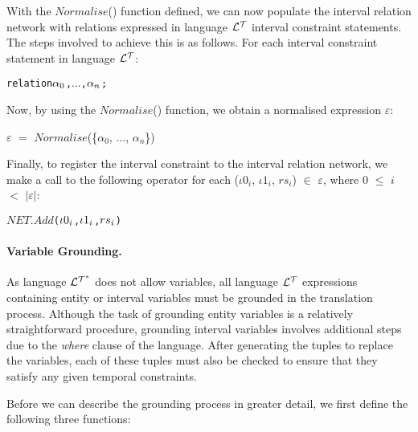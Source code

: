 \documentclass[11pt]{report}
\newenvironment{vverbatim}
{
  \begin{alltt}
}
{
    \vspace{-\baselineskip}
  \end{alltt}
}
\newenvironment{vquote}
{
  \begin{list}{}{\leftmargin 1em}\item[]
}
{
  \end{list}
}
\begin{document}
            With the $Normalise$() function defined, we can now populate the
            interval relation network with relations expressed in language
            ${\cal L^T}$ interval constraint statements. The steps involved
            to achieve this is as follows. For each interval constraint
            statement in language ${\cal L^T}$:

            \begin{vverbatim}
  relation \(\alpha\sb{0}\), \(\ldots\), \(\alpha\sb{n}\);
            \end{vverbatim}

            Now, by using the $Normalise$() function, we obtain a normalised
            expression $\varepsilon$:

            \begin{vquote}
              $\varepsilon$ $=$
                $Normalise$(\{${\alpha}_0$, $\ldots$, ${\alpha}_n$\})
            \end{vquote}

            Finally, to register the interval constraint to the interval
            relation network, we make a call to the following operator
            for each (${\iota}0_i$, ${\iota}1_i$, $rs_i$) $\in$
            $\varepsilon$, where $0$ $\leq$ $i$ $<$ $|\varepsilon|$:

            \begin{vverbatim}
  \(NET.Add\)(\({\iota}0\sb{i}\), \({\iota}1\sb{i}\), \(rs\sb{i}\))
            \end{vverbatim}

          \paragraph
            {\bf Variable Grounding.}

            As language ${\cal L^{T^*}}$ does not allow variables, all
	    language ${\cal L^T}$ expressions containing entity or interval
            variables must be grounded in the translation process. Although
            the task of grounding entity variables is a relatively
            straightforward procedure, grounding interval variables involves
            additional steps due to the {\em where} clause of the language.
            After generating the tuples to replace the variables, each of
            these tuples must also be checked to ensure that they satisfy
            any given temporal constraints.

            Before we can describe the grounding process in greater detail,
            we first define the following three functions:
\end{document}
